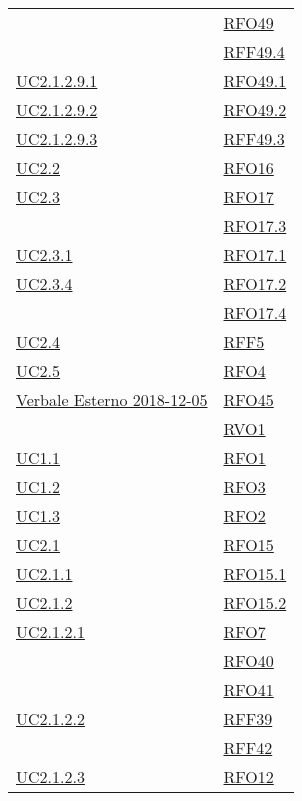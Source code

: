 \begin{longtable}{|>{\centering}m{5cm}|m{5cm}<{\centering}|}
	& \hyperlink{RFO49}{RFO49}\\
	& \hyperlink{RFF49.4}{RFF49.4}\\ \hline
	\hyperlink{UC2.1.2.9.1}{UC2.1.2.9.1} & \hyperlink{RFO49.1}{RFO49.1}\\ \hline
	\hyperlink{UC2.1.2.9.2}{UC2.1.2.9.2} & \hyperlink{RFO49.2}{RFO49.2}\\ \hline
	\hyperlink{UC2.1.2.9.3}{UC2.1.2.9.3} & \hyperlink{RFF49.3}{RFF49.3}\\ \hline
	\hyperlink{UC2.2}{UC2.2} & \hyperlink{RFO16}{RFO16}\\ \hline
	\hyperlink{UC2.3}{UC2.3} & \hyperlink{RFO17}{RFO17}\\
	& \hyperlink{RFO17.3}{RFO17.3}\\ \hline
	\hyperlink{UC2.3.1}{UC2.3.1} & \hyperlink{RFO17.1}{RFO17.1}\\ \hline
	\hyperlink{UC2.3.4}{UC2.3.4} & \hyperlink{RFO17.2}{RFO17.2}\\
	& \hyperlink{RFO17.4}{RFO17.4}\\ \hline
	\hyperlink{UC2.4}{UC2.4} & \hyperlink{RFF5}{RFF5}\\ \hline
	\hyperlink{UC2.5}{UC2.5} & \hyperlink{RFO4}{RFO4}\\ \hline
	\hyperlink{Verbale Esterno 2018-12-05}{Verbale Esterno 2018-12-05} & \hyperlink{RFO45}{RFO45}\\
	& \hyperlink{RVO1}{RVO1}\\ \hline
	\hyperref[UC1.1]{UC1.1} & \hyperlink{RFO1}{RFO1}\\ \hline
	\hyperref[UC1.2]{UC1.2} & \hyperlink{RFO3}{RFO3}\\ \hline
	\hyperref[UC1.3]{UC1.3} & \hyperlink{RFO2}{RFO2}\\ \hline
	\hyperref[UC2.1]{UC2.1} & \hyperlink{RFO15}{RFO15}\\ \hline
	\hyperref[UC2.1.1]{UC2.1.1} & \hyperlink{RFO15.1}{RFO15.1}\\ \hline
	\hyperref[UC2.1.2]{UC2.1.2} & \hyperlink{RFO15.2}{RFO15.2}\\ \hline
	\hyperref[UC2.1.2.1]{UC2.1.2.1} & \hyperlink{RFO7}{RFO7}\\
	& \hyperlink{RFO40}{RFO40}\\
	& \hyperlink{RFO41}{RFO41}\\ \hline
	\hyperref[UC2.1.2.2]{UC2.1.2.2} & \hyperlink{RFF39}{RFF39}\\
	& \hyperlink{RFF42}{RFF42}\\ \hline
	\hyperref[UC2.1.2.3]{UC2.1.2.3} & \hyperlink{RFO12}{RFO12}\\

\end{longtable}
